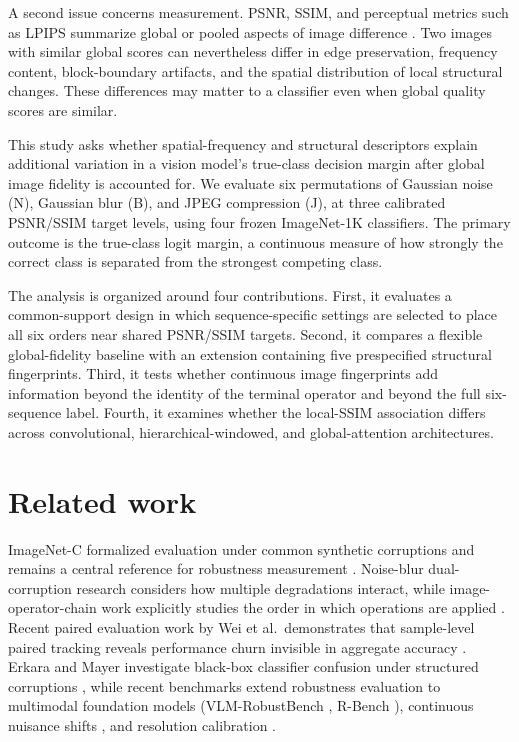 \documentclass[10pt,twocolumn]{article}
\begin{document}
A second issue concerns measurement. PSNR, SSIM, and perceptual metrics such as LPIPS summarize global or pooled aspects of image difference \cite{wang2004,zhang2018}. Two images with similar global scores can nevertheless differ in edge preservation, frequency content, block-boundary artifacts, and the spatial distribution of local structural changes. These differences may matter to a classifier even when global quality scores are similar.

This study asks whether spatial-frequency and structural descriptors explain additional variation in a vision model's true-class decision margin after global image fidelity is accounted for. We evaluate six permutations of Gaussian noise (N), Gaussian blur (B), and JPEG compression (J), at three calibrated PSNR/SSIM target levels, using four frozen ImageNet-1K classifiers. The primary outcome is the true-class logit margin, a continuous measure of how strongly the correct class is separated from the strongest competing class.

The analysis is organized around four contributions. First, it evaluates a common-support design in which sequence-specific settings are selected to place all six orders near shared PSNR/SSIM targets. Second, it compares a flexible global-fidelity baseline with an extension containing five prespecified structural fingerprints. Third, it tests whether continuous image fingerprints add information beyond the identity of the terminal operator and beyond the full six-sequence label. Fourth, it examines whether the local-SSIM association differs across convolutional, hierarchical-windowed, and global-attention architectures.

\section{Related work}

ImageNet-C formalized evaluation under common synthetic corruptions and remains a central reference for robustness measurement \cite{hendrycks2019}. Noise-blur dual-corruption research considers how multiple degradations interact, while image-operator-chain work explicitly studies the order in which operations are applied \cite{goyal2022,liao2020}. Recent paired evaluation work by Wei et al.\ demonstrates that sample-level paired tracking reveals performance churn invisible in aggregate accuracy \cite{wei2026}. Erkara and Mayer investigate black-box classifier confusion under structured corruptions \cite{erkara2026}, while recent benchmarks extend robustness evaluation to multimodal foundation models (VLM-RobustBench \cite{vlmrobustbench2026}, R-Bench \cite{li2025rbench}), continuous nuisance shifts \cite{dunkel2025}, and resolution calibration \cite{resolutioncalibrated2026}.
\end{document}
